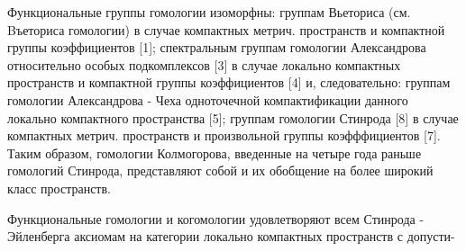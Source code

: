 \documentclass[10pt]{article}
\begin{document}
Функциональные группы гомологии изоморфны: группам Вьеториса (см. Bъеториса гомологии) в случае компактных метрич. пространств и компактной группы коэффициентов [1]; спектральным группам гомологии Александрова относительно особых подкомплексов [3] в случае локально компактных пространств и компактной группы коэффициентов [4] и, следовательно: группам гомологии Александрова - Чеха одноточечной компактификации данного локально компактного пространства [5]; группам гомологии Стинрода [8] в случае компактных метрич. пространств и произвольной группы коэфффициентов [7]. Таким образом, гомологии Колмогорова, введенные на четыре года раньше гомологий Стинрода, представляют собой и их обобщение на более широкий класс пространств.



Функциональные гомологии и когомологии удовлетворяют всем Стинрода - Эйленберга аксиомам на категории локально компактных пространств с допусти-
\end{document}
